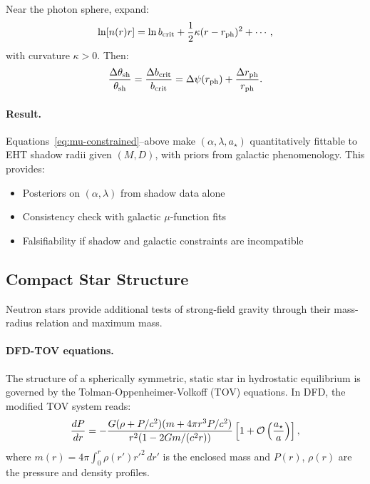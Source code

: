 Near the photon sphere, expand:
\begin{equation}
\ln[n(r)r] = \ln b_{\rm crit} + \frac{1}{2}\kappa(r - r_{\rm ph})^2 + \cdots,
\end{equation}
with curvature $\kappa > 0$. Then:
\begin{equation}
\frac{\Delta\theta_{\rm sh}}{\theta_{\rm sh}} = \frac{\Delta b_{\rm crit}}{b_{\rm crit}} = \Delta\psi(r_{\rm ph}) + \frac{\Delta r_{\rm ph}}{r_{\rm ph}}.
\end{equation}

\paragraph{Result.}
Equations~\eqref{eq:mu-constrained}--above make $(\alpha, \lambda, a_\star)$ 
quantitatively fittable to EHT shadow radii given $(M, D)$, with priors 
from galactic phenomenology. This provides:
\begin{itemize}
\item Posteriors on $(\alpha, \lambda)$ from shadow data alone
\item Consistency check with galactic $\mu$-function fits
\item Falsifiability if shadow and galactic constraints are incompatible
\end{itemize}

\subsection{Compact Star Structure}\label{sec:strong-tov}

Neutron stars provide additional tests of strong-field gravity through their mass-radius relation and maximum mass.

\paragraph{DFD-TOV equations.}
The structure of a spherically symmetric, static star in hydrostatic equilibrium is governed by the Tolman-Oppenheimer-Volkoff (TOV) equations. In DFD, the modified TOV system reads:
\begin{equation}\label{eq:dfd-tov}
\frac{dP}{dr} = -\frac{G(\rho + P/c^2)(m + 4\pi r^3 P/c^2)}{r^2(1 - 2Gm/(c^2 r))}\left[1 + \mathcal{O}\left(\frac{a_\star}{a}\right)\right],
\end{equation}
where $m(r) = 4\pi \int_0^r \rho(r') r'^2\, dr'$ is the enclosed mass and $P(r)$, $\rho(r)$ are the pressure and density profiles.

